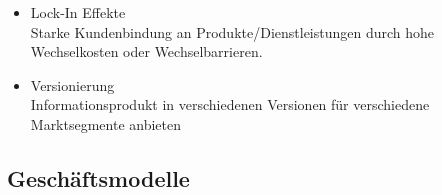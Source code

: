\documentclass[12pt,a4paper]{article}
\begin{document}
\begin{itemize}
\begin{itemize}
\begin{minipage}[t]{0.3\textwidth}
                  \end{minipage}
            \item Lock-In Effekte\\
                  Starke Kundenbindung an Produkte/Dienstleistungen durch hohe Wechselkosten oder Wechselbarrieren.
            \item Versionierung\\
                  Informationsprodukt in verschiedenen Versionen für verschiedene Marktsegmente anbieten
         \end{itemize}
\end{itemize}


\subsection{Geschäftsmodelle} %
\end{document}
